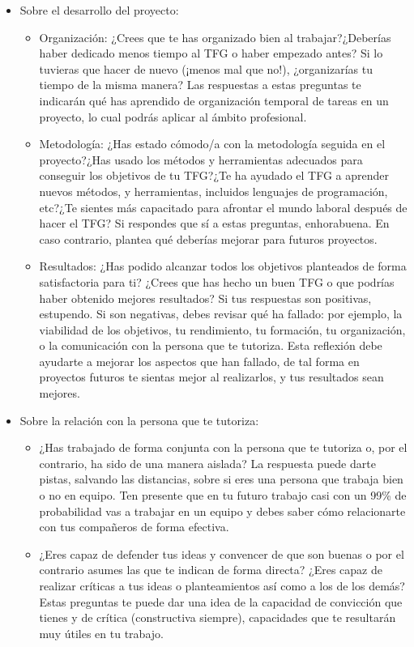 {\begin{itemize}
    \item Sobre el desarrollo del proyecto:
        \begin{itemize}
            \item Organización: ¿Crees que te has organizado bien al trabajar?¿Deberías haber dedicado menos tiempo al TFG o haber empezado antes? Si lo tuvieras que hacer de nuevo (¡menos mal que no!), ¿organizarías tu tiempo de la misma manera? Las respuestas a estas preguntas te indicarán qué has aprendido de organización temporal de tareas en un proyecto, lo cual podrás aplicar al ámbito profesional.
            \item Metodología: ¿Has estado cómodo/a con la metodología seguida en el proyecto?¿Has usado los métodos y herramientas adecuados para conseguir los objetivos de tu TFG?¿Te ha ayudado el TFG a aprender nuevos métodos, y herramientas, incluidos lenguajes de programación, etc?¿Te sientes más capacitado para afrontar el mundo laboral después de hacer el TFG? Si respondes que sí a estas preguntas, enhorabuena. En caso contrario, plantea qué deberías mejorar para futuros proyectos.
            \item Resultados: ¿Has podido alcanzar todos los objetivos planteados de forma satisfactoria para ti? ¿Crees que has hecho un buen TFG o que podrías haber obtenido mejores resultados? Si tus respuestas son positivas, estupendo. Si son negativas, debes revisar qué ha fallado: por ejemplo, la viabilidad de los objetivos, tu rendimiento, tu formación, tu organización, o la comunicación con la persona que te tutoriza. Esta reflexión debe ayudarte a mejorar los aspectos que han fallado, de tal forma en proyectos futuros te sientas mejor al realizarlos, y tus resultados sean mejores.
        \end{itemize}
    \item Sobre la relación con la persona que te tutoriza:
        \begin{itemize}
            \item ¿Has trabajado de forma conjunta con la persona que te tutoriza o, por el contrario, ha sido de una manera aislada? La respuesta puede darte pistas, salvando las distancias, sobre si eres una persona que trabaja bien o no en equipo. Ten presente que en tu futuro trabajo casi con un 99\% de probabilidad vas a trabajar en un equipo y debes saber cómo relacionarte con tus compañeros de forma efectiva. 
            \item ¿Eres capaz de defender tus ideas y convencer de que son buenas o por el contrario asumes las que te indican de forma directa? ¿Eres capaz de realizar críticas a tus ideas o planteamientos así como a los de los demás? Estas preguntas te puede dar una idea de la capacidad de convicción que tienes y de crítica (constructiva siempre), capacidades que te resultarán muy útiles en tu trabajo.

\end{itemize}
\end{itemize}}
